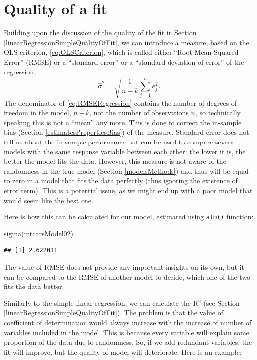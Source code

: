 \documentclass[
]{book}
\newenvironment{Shaded}{\begin{snugshade}}{\end{snugshade}}
\newcommand{\FunctionTok}[1]{\textcolor[rgb]{0.00,0.00,0.00}{#1}}
\newcommand{\NormalTok}[1]{#1}
\theoremstyle{definition}
\theoremstyle{definition}
\theoremstyle{definition}
\theoremstyle{definition}
\theoremstyle{remark}
\begin{document}
\hypertarget{linearRegressionMultipleQualityOfFit}{%
\section{Quality of a fit}\label{linearRegressionMultipleQualityOfFit}}

Building upon the discussion of the quality of the fit in Section \ref{linearRegressionSimpleQualityOfFit}, we can introduce a measure, based on the OLS criterion, \eqref{eq:OLSCriterion}, which is called either ``Root Mean Squared Error'' (RMSE) or a ``standard error'' or a ``standard deviation of error'' of the regression:
\begin{equation}
    \hat{\sigma}^2 = \sqrt{\frac{1}{n-k} \sum_{j=1}^n e_j^2 }.
    \label{eq:RMSERegression}
\end{equation}
The denominator of \eqref{eq:RMSERegression} contains the number of degrees of freedom in the model, \(n-k\), not the number of observations \(n\), so technically speaking this is not a ``mean'' any more. This is done to correct the in-sample bias (Section \ref{estimatesPropertiesBias}) of the measure. Standard error does not tell us about the in-sample performance but can be used to compare several models with the same response variable between each other: the lower it is, the better the model fits the data. However, this measure is not aware of the randomness in the true model (Section \ref{modelsMethods}) and thus will be equal to zero in a model that fits the data perfectly (thus ignoring the existence of error term). This is a potential issue, as we might end up with a poor model that would seem like the best one.

Here is how this can be calculated for our model, estimated using \texttt{alm()} function:

\begin{Shaded}
\begin{Highlighting}[]
\FunctionTok{sigma}\NormalTok{(mtcarsModel02)}
\end{Highlighting}
\end{Shaded}

\begin{verbatim}
## [1] 2.622011
\end{verbatim}

The value of RMSE does not provide any important insights on its own, but it can be compared to the RMSE of another model to decide, which one of the two fits the data better.

Similarly to the simple linear regression, we can calculate the R\(^2\) (see Section \ref{linearRegressionSimpleQualityOfFit}). The problem is that the value of coefficient of determination would always increase with the increase of number of variables included in the model. This is because every variable will explain some proportion of the data due to randomness. So, if we add redundant variables, the fit will improve, but the quality of model will deteriorate. Here is an example:
\end{document}
